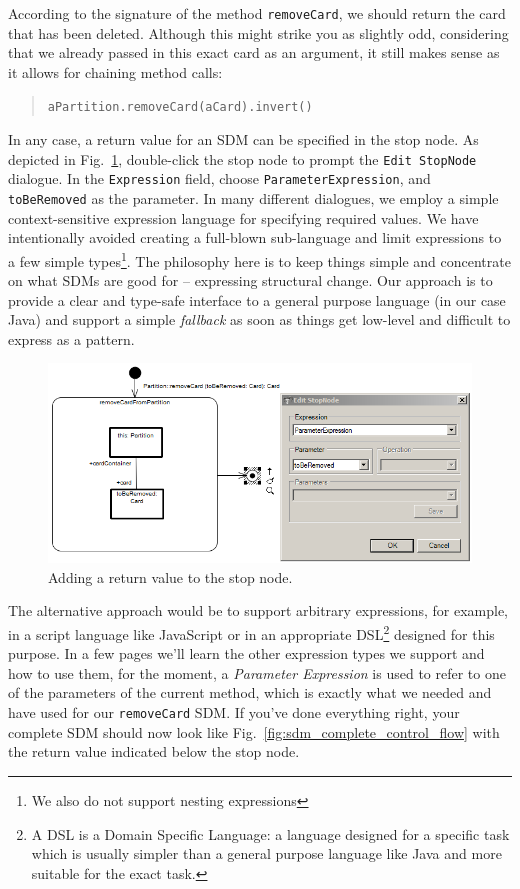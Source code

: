 According to the signature of the method \texttt{removeCard}, we should return
the card that has been deleted.  Although this might strike you as slightly odd,
considering that we already passed in this exact card as an argument, it still
makes sense as it allows for chaining method calls:
\begin{quote}\texttt{aPartition.removeCard(aCard).invert()}\end{quote}
In any case, a return value for an SDM can be specified in the stop node.
As depicted in Fig.~\ref{fig:stop_node_return_value}, double-click the stop
node to prompt the \texttt{Edit StopNode} dialogue.
In the \texttt{Expression} field, choose \texttt{ParameterExpression}, and
\texttt{toBeRemoved} as the parameter.  In many different dialogues, we employ a
simple context-sensitive expression language for specifying required values.  We
have intentionally avoided creating a full-blown sub-language and limit
expressions to a few simple types\footnote{We also do not support nesting
expressions}.  The philosophy here is to keep things simple and concentrate on
what SDMs are good for -- expressing structural change.  Our approach is to
provide a clear and type-safe interface to a general purpose language (in our
case Java) and support a simple \emph{fallback} as soon as things get low-level
and difficult to express as a pattern.  

\begin{figure}[htp]
\begin{center}
  \includegraphics[width=\textwidth]{pics/sdmBilder/removeCard/sdm14RAW}
  \caption{Adding a return value to the stop node.}  
  \label{fig:stop_node_return_value}
\end{center}
\end{figure}

The alternative approach would be to
support arbitrary expressions, for example, in a script language like
JavaScript or in an appropriate DSL\footnote{A DSL is a Domain Specific
Language: a language designed for a specific task which is usually simpler
than a general purpose language like Java and more suitable for the exact task.}
designed for this purpose. In a few pages we'll learn the other expression types
we support and how to use them, for the moment, a \emph{Parameter Expression} is
used to refer to one of the parameters of the current method, which is exactly
what we needed and have used for our \texttt{removeCard} SDM.
If you've done everything right, your complete SDM should now look like
Fig.~\ref{fig:sdm_complete_control_flow} with the return value indicated below
the stop node.

